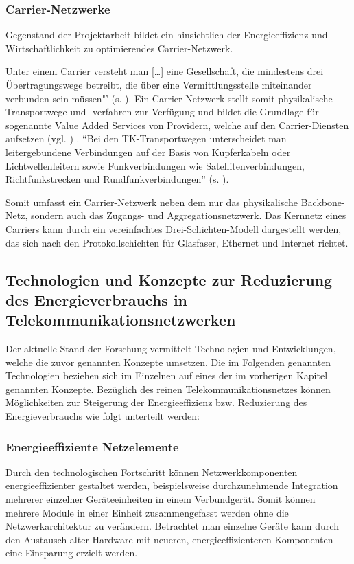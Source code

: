 \subsubsection{Carrier-Netzwerke}
Gegenstand der Projektarbeit bildet ein hinsichtlich der Energieeffizienz und Wirtschaftlichkeit zu optimierendes Carrier-Netzwerk.

Unter einem Carrier versteht man […] eine Gesellschaft, die mindestens drei Übertra\-gungs\-wege betreibt, die über eine Vermittlungsstelle miteinander verbunden sein müssen"' (s. \cite{carrier}). Ein Carrier-Netzwerk stellt somit physikalische Transportwege und -verfahren zur Verfügung und bildet die Grundlage für sogenannte Value Added Services von Providern, welche auf den Carrier-Diensten aufsetzen (vgl. \cite{fassnacht}) . "`Bei den TK-Transportwegen unterscheidet man leitergebundene Verbindungen auf der Basis von Kupferkabeln oder Lichtwellenleitern sowie Funkverbindungen wie Satellitenverbindungen, Richtfunkstrecken und Rundfunkverbindungen"' (s. \cite{fassnacht}).

Somit umfasst ein Carrier-Netzwerk neben dem nur das physikalische Backbone-Netz, sondern auch das Zugangs- und Aggregationsnetzwerk. Das Kernnetz eines Carriers kann durch ein vereinfachtes Drei-Schichten-Modell dargestellt werden, das sich nach den Protokollschichten für Glasfaser, Ethernet und Internet richtet. 



\subsection{Technologien und Konzepte zur Reduzierung des Energieverbrauchs in Telekommunikationsnetzwerken}
Der aktuelle Stand der Forschung vermittelt Technologien und Entwicklungen, welche die zuvor genannten Konzepte umsetzen. Die im Folgenden genannten Technologien beziehen sich im Einzelnen auf eines der im vorherigen Kapitel genannten Konzepte. Bezüglich des reinen Telekommunikationsnetzes können Möglichkeiten zur Steigerung der Energieeffizienz bzw. Reduzierung des Energieverbrauchs wie folgt unterteilt werden:

\subsubsection{Energieeffiziente Netzelemente}
Durch den technologischen Fortschritt können Netzwerkkomponenten energieeffizienter gestaltet werden, beispielsweise durchzunehmende Integration mehrerer einzelner Geräte\-einheiten in einem Verbundgerät. Somit können mehrere Module in einer Einheit zusammengefasst werden ohne die Netzwerkarchitektur zu verändern. Betrachtet man einzelne Geräte kann durch den Austausch alter Hardware mit neueren, energieeffizienteren Komponenten eine Einsparung erzielt werden. 

